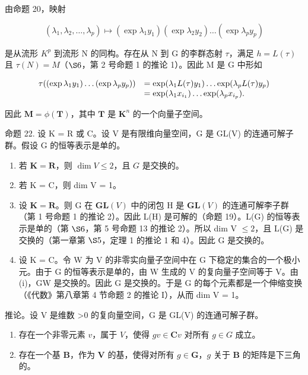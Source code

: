 由命题 20，映射

\[
\left(\lambda_ {1}, \lambda_ {2}, \dots , \lambda_ {p}\right) \mapsto \left(\exp \lambda_ {1} y _ {1}\right) \left(\exp \lambda_ {2} y _ {2}\right) \dots \left(\exp \lambda_ {p} y _ {p}\right)
\]

是从流形 \(K^{p}\) 到流形 N 的同构。存在从 N 到 G 的李群态射 \(\tau\)，满足 \(h = L(\tau)\) 且 \(\tau(N) = M\)（\(\S 6\)，第 2 号命题 1 的推论 1）。因此 M 是 G 中形如

\[
\begin{array}{r l} \tau ((\exp \lambda_ {1} y _ {1}) \dots (\exp \lambda_ {p} y _ {p})) & = \exp (\lambda_ {1} L (\tau) y _ {1}) \dots \exp (\lambda_ {p} L (\tau) y _ {p}) \\ & = \exp (\lambda_ {1} x _ {i _ {1}}) \dots \exp (\lambda_ {p} x _ {i _ {p}}). \end{array}
\]

因此 \(\mathbf{M} = \phi (\mathbf{T})\)，其中 \(\mathbf{T}\) 是 \(\mathbf{K}^n\) 的一个向量子空间。

命题 22. 设 K = R 或 C。设 V 是有限维向量空间，G 是 GL(V) 的连通可解子群。假设 G 的恒等表示是单的。

\begin{enumerate}
\def\labelenumi{(\roman{enumi})}
\item
  若 \(\mathbf{K} = \mathbf{R}\)，则 \(\dim V \leqslant 2\)，且 \(G\) 是交换的。
\item
  若 K = C，则 dim V = 1。
\item
  设 \(\mathbf{K} = \mathbf{R}\)。则 G 在 \(\mathbf{GL}(V)\) 中的闭包 H 是 \(\mathbf{GL}(V)\) 的连通可解李子群（第 1 号命题 1 的推论 2）。因此 L(H) 是可解的（命题 19）。L(G) 的恒等表示是单的（第 \(\S 6\)，第 5 号命题 13 的推论 2）。所以 dim V \(\leqslant 2\)，且 L(G) 是交换的（第一章第 \(\S 5\)，定理 1 的推论 1 和 4）。因此 G 是交换的。
\item
  设 K = C。令 W 为 V 的非零实向量子空间中在 G 下稳定的集合的一个极小元。由于 G 的恒等表示是单的，由 W 生成的 V 的复向量子空间等于 V。由 (i)，G\textbar W 是交换的。因此 G 是交换的。于是 G 的每个元素都是一个伸缩变换（《代数》第八章第 4 节命题 2 的推论 I），从而 dim V = 1。
\end{enumerate}

推论。设 V 是维数 \textgreater0 的复向量空间，G 是 GL(V) 的连通可解子群。

\begin{enumerate}
\def\labelenumi{(\roman{enumi})}
\item
  存在一个非零元素 \(v\)，属于 \(V\)，使得 \(gv \in \mathbf{C}v\) 对所有 \(g \in G\) 成立。
\item
  存在一个基 \(\mathbf{B}\)，作为 \(\mathbf{V}\) 的基，使得对所有 \(g \in \mathbf{G}\)，\(g\) 关于 \(\mathbf{B}\) 的矩阵是下三角的。
\end{enumerate}

